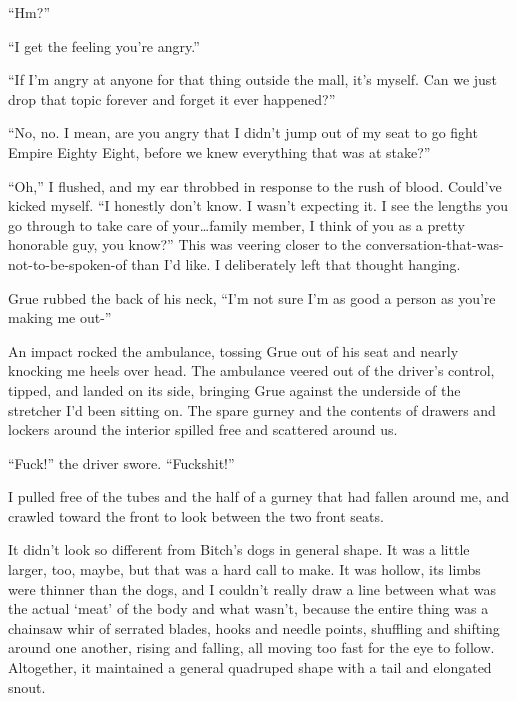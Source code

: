 ``Hm?''



``I get the feeling you're angry.''



``If I'm angry at anyone for that thing outside the mall, it's myself.  Can we just drop that topic forever and forget it ever happened?''



``No, no.  I mean, are you angry that I didn't jump out of my seat to go fight Empire Eighty Eight, before we knew everything that was at stake?''



``Oh,'' I flushed, and my ear throbbed in response to the rush of blood.  Could've kicked myself.  ``I honestly don't know.  I wasn't expecting it.  I see the lengths you go through to take care of your\ldots family member, I think of you as a pretty honorable guy, you know?''  This was veering closer to the conversation-that-was-not-to-be-spoken-of than I'd like.  I deliberately left that thought hanging.



Grue rubbed the back of his neck, ``I'm not sure I'm as good a person as you're making me out-''



An impact rocked the ambulance, tossing Grue out of his seat and nearly knocking me heels over head.  The ambulance veered out of the driver's control, tipped, and landed on its side, bringing Grue against the underside of the stretcher I'd been sitting on.  The spare gurney and the contents of drawers and lockers around the interior spilled free and scattered around us.



``Fuck!'' the driver swore.  ``Fuckshit!''



I pulled free of the tubes and the half of a gurney that had fallen around me, and crawled toward the front to look between the two front seats.



It didn't look so different from Bitch's dogs in general shape.  It was a little larger, too, maybe, but that was a hard call to make.  It was hollow, its limbs were thinner than the dogs, and I couldn't really draw a line between what was the actual `meat' of the body and what wasn't, because the entire thing was a chainsaw whir of serrated blades, hooks and needle points, shuffling and shifting around one another, rising and falling, all moving too fast for the eye to follow.  Altogether, it maintained a general quadruped shape with a tail and elongated snout.



